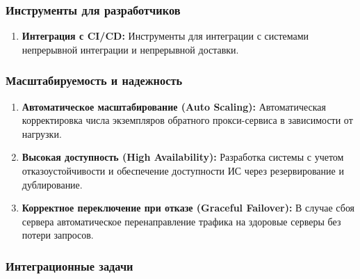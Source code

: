 \documentclass[14pt, a4paper]{extarticle}
\begin{document}
\subsubsection*{Инструменты для разработчиков}

\begin{enumerate}
\item \textbf{Интеграция с CI/CD:} Инструменты для интеграции с системами непрерывной интеграции и непрерывной доставки.
\end{enumerate}

\subsubsection*{Масштабируемость и надежность}

\begin{enumerate}
\item \textbf{Автоматическое масштабирование (Auto Scaling):} Автоматическая корректировка числа экземпляров обратного прокси-сервиса в зависимости от нагрузки.
\item \textbf{Высокая доступность (High Availability):} Разработка системы с учетом отказоустойчивости и обеспечение доступности ИС через резервирование и дублирование.
\item \textbf{Корректное переключение при отказе (Graceful Failover):} В случае сбоя сервера автоматическое перенаправление трафика на здоровые серверы без потери запросов.
\end{enumerate}

\subsubsection*{Интеграционные задачи}
\end{document}
